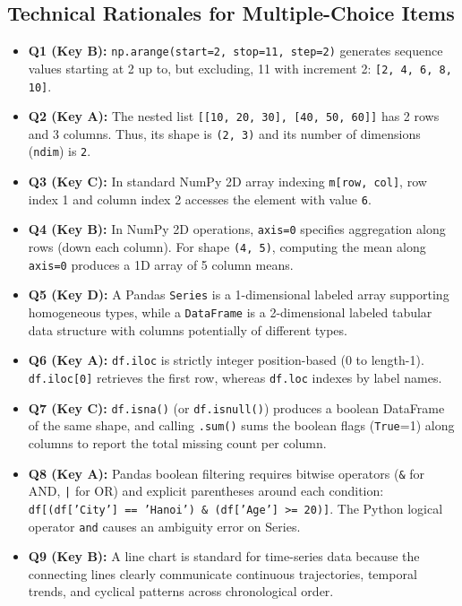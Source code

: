 \documentclass[11pt,a4paper]{article}
\begin{document}
\vspace{1mm}
\subsection*{Technical Rationales for Multiple-Choice Items}
\begin{itemize}[leftmargin=*, itemsep=3.5pt]
  \item \textbf{Q1 (Key B):} \texttt{np.arange(start=2, stop=11, step=2)} generates sequence values starting at 2 up to, but excluding, 11 with increment 2: \texttt{[2, 4, 6, 8, 10]}.
  \item \textbf{Q2 (Key A):} The nested list \texttt{[[10, 20, 30], [40, 50, 60]]} has 2 rows and 3 columns. Thus, its shape is \texttt{(2, 3)} and its number of dimensions (\texttt{ndim}) is \texttt{2}.
  \item \textbf{Q3 (Key C):} In standard NumPy 2D array indexing \texttt{m[row, col]}, row index 1 and column index 2 accesses the element with value \texttt{6}.
  \item \textbf{Q4 (Key B):} In NumPy 2D operations, \texttt{axis=0} specifies aggregation along rows (down each column). For shape \texttt{(4, 5)}, computing the mean along \texttt{axis=0} produces a 1D array of 5 column means.
  \item \textbf{Q5 (Key D):} A Pandas \texttt{Series} is a 1-dimensional labeled array supporting homogeneous types, while a \texttt{DataFrame} is a 2-dimensional labeled tabular data structure with columns potentially of different types.
  \item \textbf{Q6 (Key A):} \texttt{df.iloc} is strictly integer position-based (0 to length-1). \texttt{df.iloc[0]} retrieves the first row, whereas \texttt{df.loc} indexes by label names.
  \item \textbf{Q7 (Key C):} \texttt{df.isna()} (or \texttt{df.isnull()}) produces a boolean DataFrame of the same shape, and calling \texttt{.sum()} sums the boolean flags (\texttt{True}=1) along columns to report the total missing count per column.
  \item \textbf{Q8 (Key A):} Pandas boolean filtering requires bitwise operators (\texttt{\&} for AND, \texttt{|} for OR) and explicit parentheses around each condition: \texttt{df[(df['City'] == 'Hanoi') \& (df['Age'] >= 20)]}. The Python logical operator \texttt{and} causes an ambiguity error on Series.
  \item \textbf{Q9 (Key B):} A line chart is standard for time-series data because the connecting lines clearly communicate continuous trajectories, temporal trends, and cyclical patterns across chronological order.

\end{itemize}
\end{document}
